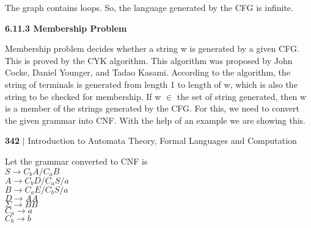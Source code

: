 \documentclass[a4]{article}
\begin{document}
\hspace*{0.5cm} The graph contains loops. So, the language generated by the CFG is infinite.\\
\vspace*{0.2cm}

\large{
\textbf{6.11.3 Membership Problem}\\
}

\vspace*{0.2cm}
\small{
Membership problem decides whether a string w is generated by a given CFG.\\
\hspace*{0.5cm} This is proved by the CYK algorithm. This algorithm was proposed by John Cocke, Daniel Younger,
and Tadao Kasami. According to the algorithm, the string of terminals is generated from length 1 to
length of w, which is also the string to be checked for membership. If w $\in$ the set of string generated,
then w is a member of the strings generated by the CFG. For this, we need to convert the given grammar
into CNF. With the help of an example we are showing this.\\
}

\newpage
 \begin{flushleft}
    \textbf{342}\hspace*{0.1cm} \textbf{$|$} \hspace*{0.1cm} Introduction to Automata Theory, Formal Languages and Computation
  \end{flushleft}
\vspace*{0.5cm}

 \hspace*{0.2cm} Let the grammar converted to CNF is\\

\vspace*{0.2cm}
\hspace*{4cm} $S \rightarrow C_{b}A/C_{a}B$ \\
\hspace*{4cm} $A \rightarrow C_{b}D/C_{a}S/a$ \\
\hspace*{4cm} $B \rightarrow C_{a}E/C_{b}S/a$ \\
\hspace*{4cm} $D \rightarrow AA$ \\
\hspace*{4cm} $\Sigma \rightarrow BB$ \\
\hspace*{4cm} $C_{a} \rightarrow a$ \\
\hspace*{4cm} $C_{b} \rightarrow b$ \\
\end{document}
